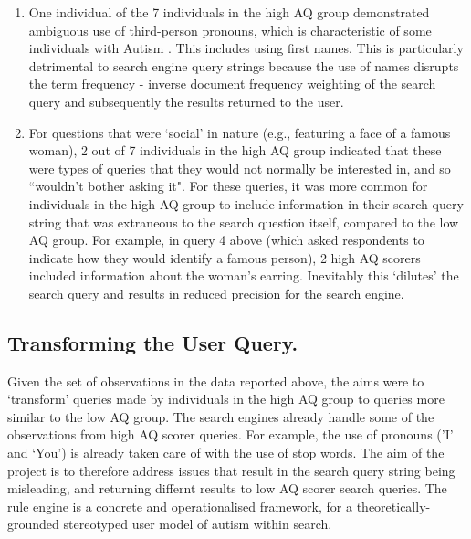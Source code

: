 \documentclass[a4paper, 11pt]{article}
\begin{document}
\begin{enumerate}
\item{One individual of the 7 individuals in the high AQ group demonstrated ambiguous use of third-person pronouns, which is characteristic of some individuals with Autism \cite{pronoun}. This includes using first names. This is particularly detrimental to search engine query strings because the use of names disrupts the term frequency - inverse document frequency weighting \cite{tfidf} of the search query and subsequently the results returned to the user.
}\label{pronoun}
 
\item{
For questions that were `social' in nature (e.g., featuring a face of a famous woman), 2 out of 7 individuals in the high AQ group indicated that these were types of queries that they would not normally be interested in, and so ``wouldn't bother asking it". For these queries, it was more common for individuals in the high AQ group to include information in their search query string that was extraneous to the search question itself, compared to the low AQ group. For example, in query 4 above (which asked respondents to indicate how they would identify a famous person), 2 high AQ scorers included information about the woman's earring. Inevitably this `dilutes' the search query and results in reduced precision for the search engine.
}

\end{enumerate}


\subsection{Transforming the User Query.}
Given the set of observations in the data reported above, the aims were to `transform' queries made by individuals in the high AQ group to queries more similar to the low AQ group. The search engines already handle some of the observations from high AQ scorer queries. For example, the use of pronouns ('I' and `You') is already taken care of with the use of stop words. The aim of the project is to therefore address issues that result in the search query string being misleading, and returning differnt results to low AQ scorer search queries. The rule engine is a concrete and operationalised framework, for a theoretically-grounded stereotyped user model of autism within search. \\
\end{document}

